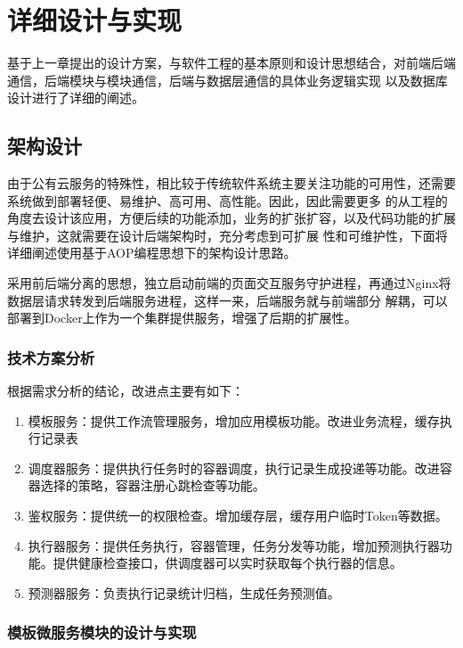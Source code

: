 
\chapter{详细设计与实现}
基于上一章提出的设计方案，与软件工程的基本原则和设计思想结合，对前端后端通信，后端模块与模块通信，后端与数据层通信的具体业务逻辑实现
以及数据库设计进行了详细的阐述。


\section{架构设计}
由于公有云服务的特殊性，相比较于传统软件系统主要关注功能的可用性，还需要系统做到部署轻便、易维护、高可用、高性能。因此，因此需要更多
的从工程的角度去设计该应用，方便后续的功能添加，业务的扩张扩容，以及代码功能的扩展与维护，这就需要在设计后端架构时，充分考虑到可扩展
性和可维护性，下面将详细阐述使用基于AOP编程思想下的架构设计思路\cite{zw9}。

采用前后端分离的思想，独立启动前端的页面交互服务守护进程，再通过Nginx将数据层请求转发到后端服务进程，这样一来，后端服务就与前端部分
解耦，可以部署到Docker上作为一个集群提供服务，增强了后期的扩展性\cite{zw8}。



\subsection{技术方案分析}

根据需求分析的结论，改进点主要有如下：
\begin{enumerate}
    \item 模板服务：提供工作流管理服务，增加应用模板功能。改进业务流程，缓存执行记录表
    \item 调度器服务：提供执行任务时的容器调度，执行记录生成投递等功能。改进容器选择的策略，容器注册心跳检查等功能。
    \item 鉴权服务：提供统一的权限检查。增加缓存层，缓存用户临时Token等数据。
    \item 执行器服务：提供任务执行，容器管理，任务分发等功能，增加预测执行器功能。提供健康检查接口，供调度器可以实时获取每个执行器的信息。
    \item 预测器服务：负责执行记录统计归档，生成任务预测值。
\end{enumerate}


\subsection{模板微服务模块的设计与实现}



